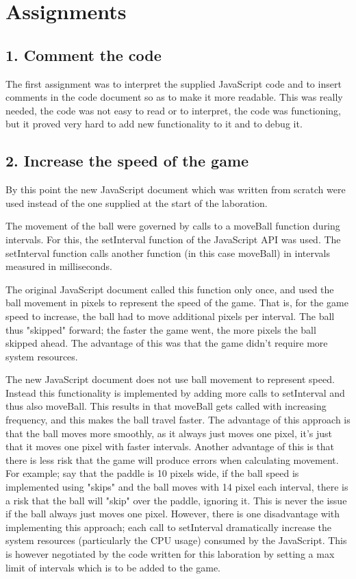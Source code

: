 \documentclass[a4paper,10pt]{article}
\begin{document}
\section{Assignments}
\subsection{1. Comment the code}
The first assignment was to interpret the supplied JavaScript code and to insert comments in the code document so as to make it more readable. This was really needed, the code was not easy to read or to interpret, the code was functioning, but it proved very hard to add new functionality to it and to debug it.

\subsection{2. Increase the speed of the game}
By this point the new JavaScript document which was written from scratch were used instead of the one supplied at the start of the laboration. 

The movement of the ball were governed by calls to a moveBall function during intervals. For this, the setInterval function of the JavaScript API was used. The setInterval function calls another function (in this case moveBall) in intervals measured in milliseconds. 

The original JavaScript document called this function only once, and used the ball movement in pixels to represent the speed of the game. That is, for the game speed to increase, the ball had to move additional pixels per interval. The ball thus "skipped" forward; the faster the game went, the more pixels the ball skipped ahead. The advantage of this was that the game didn't require more system resources.

The new JavaScript document does not use ball movement to represent speed. Instead this functionality is implemented by adding more calls to setInterval and thus also moveBall. This results in that moveBall gets called with increasing frequency, and this makes the ball travel faster. The advantage of this approach is that the ball moves more smoothly, as it always just moves one pixel, it's just that it moves one pixel with faster intervals. Another advantage of this is that there is less risk that the game will produce errors when calculating movement. For example; say that the paddle is 10 pixels wide, if the ball speed is implemented using "skips" and the ball moves with 14 pixel each interval, there is a risk that the ball will "skip" over the paddle, ignoring it. This is never the issue if the ball always just moves one pixel. However, there is one disadvantage with implementing this approach; each call to setInterval dramatically increase the system resources (particularly the CPU usage) consumed by the JavaScript. This is however negotiated by the code written for this laboration by setting a max limit of intervals which is to be added to the game.
\end{document}
